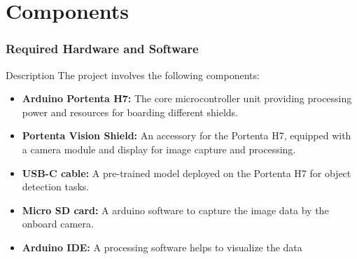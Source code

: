 \documentclass[10pt, a4paper]{beamer}
\begin{document}
	\section{Components}
	\begin{frame}
		
	
		\frametitle{Required Hardware and Software}
		
		\begin{block}{Description}
			The project involves the following components:
			\begin{itemize}
				\item \textbf{Arduino Portenta H7:} The core microcontroller unit providing processing power and resources for boarding different shields.
				\item \textbf{Portenta Vision Shield:} An accessory for the Portenta H7, equipped with a camera module and display for image capture and processing.
				\item \textbf{USB-C cable:} A pre-trained model deployed on the Portenta H7 for object detection tasks.
				\item \textbf{Micro SD card:} A arduino software to capture the image data by the onboard camera.
				\item \textbf{Arduino IDE:} A processing software helps to visualize the data
			\end{itemize}
		\end{block}
		
	\end{frame}
	
\end{document}
